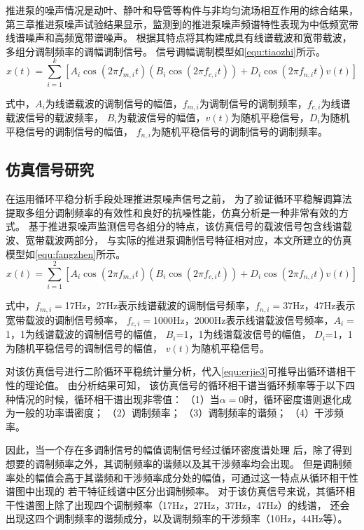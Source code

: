 推进泵的噪声情况是动叶、静叶和导管等构件与非均匀流场相互作用的综合结果，
第三章推进泵噪声试验结果显示，监测到的推进泵噪声频谱特性表现为中低频宽带线谱噪声和高频宽带谱噪声。
根据其特点将其构建成具有线谱载波和宽带载波，多组分调制频率的调幅调制信号\cite{Tarkan2013PREDICTION}。
信号调幅调制模型如\autoref{equ:tiaozhi}所示。
\begin{equation}
    \label{equ:tiaozhi}
    x\left ( t \right ) =\sum_{i=1}^{k}\left [ A_{i}\cos \left ( 2\pi f_{m,i}t  \right )\left ( B_{i}\cos\left ( 2\pi f_{c,i}t  \right )   \right )+D_{i}\cos\left ( 2\pi f_{n,i}t  \right )v\left ( t \right )      \right ]  
\end{equation}

式中，$A_i$为线谱载波的调制信号的幅值，$f_{m,i}$为调制信号的调制频率，$f_{c,i}$为线谱载波信号的载波频率，
$B_i$为载波信号的幅值，$v\left ( t \right )$为随机平稳信号，$D_i$为随机平稳信号的调制信号的幅值，
$f_{n,i}$为随机平稳信号的调制信号的调制频率。
\subsection{仿真信号研究}
在运用循环平稳分析手段处理推进泵噪声信号之前，
为了验证循环平稳解调算法提取多组分调制频率的有效性和良好的抗噪性能，仿真分析是一种非常有效的方式。
基于推进泵噪声监测信号各组分的特点，该仿真信号的载波信号包含线谱载波、宽带载波两部分，
与实际的推进泵调制信号特征相对应，本文所建立的仿真模型如\autoref{equ:fangzhen}所示。 
\begin{equation}
    \label{equ:fangzhen}
    x\left ( t \right ) =\sum_{i=1}^{2}\left [ A_{i}\cos \left ( 2\pi f_{m,i}t  \right )\left ( B_{i}\cos\left ( 2\pi f_{c,i}t  \right )   \right )+D_{i}\cos\left ( 2\pi f_{n,i}t  \right )v\left ( t \right )      \right ]  
\end{equation}

式中，$f_{m,i}=$17Hz，27Hz表示线谱载波的调制信号频率，$f_{n,i}=$37Hz，47Hz表示宽带载波的调制信号频率，
$f_{c,i}=$1000Hz，2000Hz表示线谱载波信号频率，$A_i=$1，1为线谱载波的调制信号的幅值，
$B_i$=1，1为线谱载波信号的幅值，
$D_i$=1，1为随机平稳信号的调制信号的幅值，
$v\left ( t \right )$为随机平稳信号。

对该仿真信号进行二阶循环平稳统计量分析，代入\autoref{equ:erjie3}可推导出循环谱相干性的理论值。
由分析结果可知，
该仿真信号的循环相干谱当循环频率等于以下四种情况的时候，循环相干谱出现非零值：
（1）当$\alpha=0$时，循环密度谱则退化成为一般的功率谱密度；
（2）调制频率；
（3）调制频率的谐频；
（4）干涉频率。

因此，当一个存在多调制信号的幅值调制信号经过循环密度谱处理
后，除了得到想要的调制频率之外，其调制频率的谐频以及其干涉频率均会出现。
但是调制频率处的幅值会高于其谐频和干涉频率成分处的幅值，可通过这一特点从循环相干性谱图中出现的
若干特征线谱中区分出调制频率。
对于该仿真信号来说，其循环相干性谱图上除了出现四个调制频率（17Hz，27Hz，37Hz，47Hz）的线谱，
还会出现这四个调制频率的谐频成分，以及调制频率的干涉频率（10Hz，44Hz等）。

